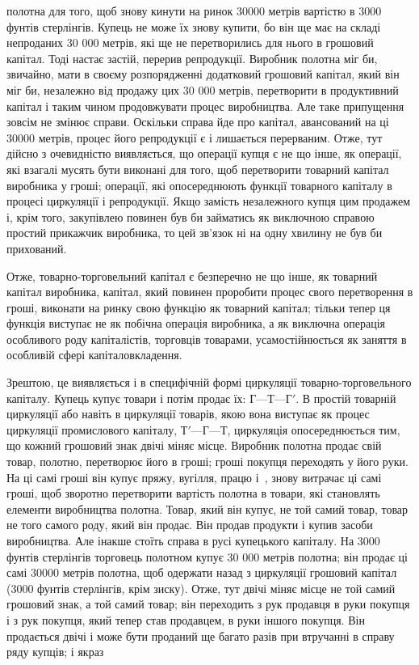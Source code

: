 \parcont{}  %
полотна для того, щоб знову кинути на ринок 30000 метрів вартістю в 3000 фунтів стерлінгів. Купець
не може їх знову купити, бо він ще має на складі непроданих 30 000 метрів, які ще
не перетворились для нього в грошовий капітал. Тоді настає
застій, перерив репродукції. Виробник полотна міг би, звичайно,
мати в своєму розпорядженні додатковий грошовий капітал, який
він міг би, незалежно від продажу цих 30 000 метрів, перетворити
в продуктивний капітал і таким чином продовжувати процес
виробництва. Але таке припущення зовсім не змінює справи.
Оскільки справа йде про капітал, авансований на ці 30000 метрів,
процес його репродукції є і лишається перерваним. Отже, тут
дійсно з очевидністю виявляється, що операції купця є не що
інше, як операції, які взагалі мусять бути виконані для того, щоб
перетворити товарний капітал виробника у гроші; операції, які
опосереднюють функції товарного капіталу в процесі циркуляції і репродукції. Якщо замість
незалежного купця цим продажем і, крім того, закупівлею повинен був би займатись як виключною
справою простий прикажчик виробника, то цей зв’язок ні
на одну хвилину не був би прихований.

Отже, товарно-торговельний капітал є безперечно не що
інше, як товарний капітал виробника, капітал, який повинен проробити процес свого перетворення в
гроші, виконати на ринку
свою функцію як товарний капітал; тільки тепер ця функція виступає не як побічна операція виробника,
а як виключна операція особливого роду капіталістів, торговців товарами, усамостійнюється як заняття
в особливій сфері капіталовкладення.

Зрештою, це виявляється і в специфічній формі циркуляції
товарно-торговельного капіталу. Купець купує товари і потім
продає їх: $Г — Т — Г'$. В простій товарній циркуляції або навіть
в циркуляції товарів, якою вона виступає як процес циркуляції
промислового капіталу, $Т' — Г — Т$, циркуляція опосереднюється
тим, що кожний грошовий знак двічі міняє місце. Виробник полотна продає свій товар, полотно,
перетворює його в гроші;
гроші покупця переходять у його руки. На ці самі гроші він
купує пряжу, вугілля, працю і~, знову витрачає ці самі
гроші, щоб зворотно перетворити вартість полотна в товари, які
становлять елементи виробництва полотна. Товар, який він купує, не той самий товар, товар не того
самого роду, який
він продає. Він продав продукти і купив засоби виробництва. Але
інакше стоїть справа в русі купецького капіталу. На 3000 фунтів стерлінгів торговець полотном купує
30 000 метрів полотна;
він продає ці самі 30000 метрів полотна, щоб одержати назад
з циркуляції грошовий капітал (3000 фунтів стерлінгів, крім
зиску). Отже, тут двічі міняє місце не той самий грошовий знак,
а той самий товар; він переходить з рук продавця в руки покупця і з рук покупця, який тепер став
продавцем, в руки
іншого покупця. Він продається двічі і може бути проданий
ще багато разів при втручанні в справу ряду купців; і якраз
\parbreak{}  %
